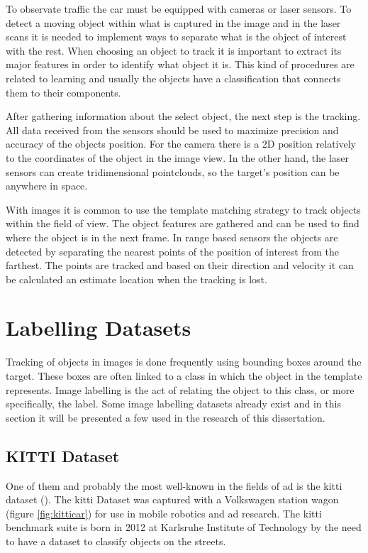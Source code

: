To observate traffic the car must be equipped with cameras or laser sensors. To detect a moving object within what is captured in the image and in the laser scans it is needed to implement ways to separate what is the object of interest with the rest. When choosing an object to track it is important to extract its major features in order to identify what object it is. This kind of procedures are related to learning and usually the objects have a classification that connects them to their components.

After gathering information about the select object, the next step is the tracking. All data received from the sensors should be used to maximize precision and accuracy of the objects position. For the camera there is a 2D position relatively to the coordinates of the object in the image view. In the other hand, the laser sensors can create tridimensional pointclouds, so the target's position can be anywhere in space. 

With images it is common to use the template matching strategy to track objects within the field of view. The object features are gathered and can be used to find where the object is in the next frame. In range based sensors the objects are detected by separating the nearest points of the position of interest from the farthest. The points are tracked and based on their direction and velocity it can be calculated an estimate location when the tracking is lost.

\section{Labelling Datasets}
Tracking of objects in images is done frequently using bounding boxes around the target. These boxes are often linked to a class in which the object in the template represents. Image labelling is the act of relating the object to this class, or more specifically, the label. Some image labelling datasets already exist and in this section it will be presented a few used in the research of this dissertation.

\subsection{KITTI Dataset}
One of them and probably the most well-known in the fields of \gls{ad} is the \gls{kitti} dataset (\cite{KarlsruheInstituteofTechnology}). The \gls{kitti} Dataset was captured with a Volkswagen station wagon (figure \ref{fig:kitticar}) for use in mobile robotics and \gls{ad} research. The \gls{kitti} benchmark suite is born in 2012 at Karlsruhe Institute of Technology by the need to have a dataset to classify objects on the streets. 

